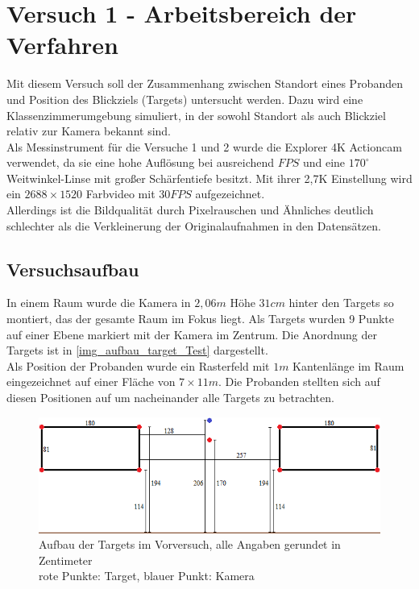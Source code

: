 \section{Versuch 1 - Arbeitsbereich der Verfahren}
Mit diesem Versuch soll der Zusammenhang zwischen Standort eines Probanden und Position des Blickziels (Targets) untersucht werden. Dazu wird eine Klassenzimmerumgebung simuliert, in der sowohl Standort als auch Blickziel relativ zur Kamera bekannt sind.\\
Als Messinstrument für die Versuche 1 und 2 wurde die Explorer 4K Actioncam verwendet, da sie eine hohe Auflösung bei ausreichend $FPS$ und eine $170^\circ$ Weitwinkel-Linse mit großer Schärfentiefe besitzt. Mit ihrer 2,7K Einstellung wird ein $2688 \times 1520$ Farbvideo mit $30FPS$ aufgezeichnet.\\
Allerdings ist die Bildqualität durch Pixelrauschen und Ähnliches deutlich schlechter als die Verkleinerung der Originalaufnahmen in den Datensätzen.
\subsection{Versuchsaufbau}
In einem Raum wurde die Kamera in $2,06m$ Höhe $31cm$ hinter den Targets so montiert, das der gesamte Raum im Fokus liegt. Als Targets wurden 9 Punkte auf einer Ebene markiert mit der Kamera im Zentrum. Die Anordnung der Targets ist in \autoref{img_aufbau_target_Test} dargestellt.\\
Als Position der Probanden wurde ein Rasterfeld mit $1m$ Kantenlänge im Raum eingezeichnet auf einer Fläche von $7 \times 11m$. Die Probanden stellten sich auf diesen Positionen auf um nacheinander alle Targets zu betrachten. 
\begin{figure}
	\centering
	\includegraphics[width=0.7\linewidth]{PositionWinkel/Target}
	\caption{Aufbau der Targets im Vorversuch, alle Angaben gerundet in Zentimeter\\rote Punkte: Target, blauer Punkt: Kamera}
	\label{img_aufbau_target_Test}
\end{figure}
